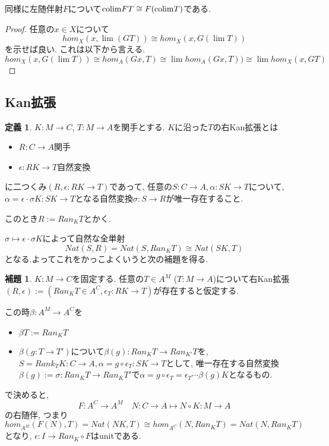 \documentclass[dvipdfmx,a4paper,11pt]{article}
\newcommand{\colim}{{\rm colim}}
\theoremstyle{definition}
\newtheorem{lem}[thm]{補題}
\newtheorem{dfn}[thm]{定義}
\begin{document}
同様に左随伴射$F$について$\colim FT \cong F(\colim T)$である.
\begin{proof}
任意の$x \in X$について
$$
hom_{X}(x, \lim (GT) ) \cong 
hom_{X}(x, G(\lim T)) 
$$
を示せば良い. これは以下から言える. 
$$
hom_{X}(x, G(\lim T)) 
\cong
hom_{A}(Gx, T) 
\cong
\lim  hom_{A}(Gx, T) )
 \cong 
\lim hom_{X}(x, GT)
$$
\end{proof}


\subsection{Kan拡張}

 \begin{tcolorbox}
 [colback = white, colframe = green!35!black, fonttitle = \bfseries,breakable = true]
\begin{dfn}
$K : M \to C$, $T : M \to A$を関手とする.
$K$に沿った$T$の右Kan拡張とは
\begin{itemize}
\item $R : C \to A$関手
\item $\epsilon : RK \to T$自然変換
\end{itemize}
に二つくみ$(R, \epsilon : RK \to T)$であって, 
任意の$S : C \to A, \alpha : SK \to T$について, $\alpha = \epsilon \cdot \sigma K : SK \to T$となる自然変換$\sigma : S \to R$が唯一存在すること. 

このとき$R := Ran_{K}T$とかく. 
\end{dfn}
\end{tcolorbox}

$\sigma \mapsto \epsilon \cdot \sigma K$によって自然な全単射
$$
Nat (S, R)=Nat (S, Ran_{K}T) \cong Nat(SK,T)
$$
となる.よってこれをかっこよくいうと次の補題を得る. 
 \begin{tcolorbox}
 [colback = white, colframe = green!35!black, fonttitle = \bfseries,breakable = true]
\begin{lem}
$K : M \to C$を固定する. 
任意の$T \in A^{M}$ ($T : M \to A$)について右Kan拡張
$(R , \epsilon) := (Ran_{K}T \in A^C, \epsilon_T : RK \to T)$が存在すると仮定する.

この時$\beta : A^M \to A^C$を
\begin{itemize}
\item $\beta T := Ran_{K}T$
\item $\beta (g : T \to T')$について$\beta(g) : Ran_{K}T \to Ran_{K'}T$を, $S = Rank_{T}K :C \to A, \alpha =g\circ \epsilon_T : SK \to T$として, 唯一存在する自然変換
$\beta(g):=\sigma :  Ran_{K}T \to Ran_{K}T'$で$\alpha =g\circ \epsilon_T  = \epsilon_T \cdots \beta(g)K$となるもの. 
\end{itemize}
で決めると, 
$$
F : A^C \to A^M \quad N :C\to A\mapsto N \circ K : M \to A 
$$
の右随伴, つまり
$$
hom_{A^M}(F(N), T) = Nat(NK,T)\cong hom_{A^C}(N, Ran_{K}T)=Nat (N, Ran_{K}T)
$$
となり, $\epsilon :  I \to Ran_{K} \circ F$はunitである. 
\end{lem}
\end{tcolorbox}
\end{document}
